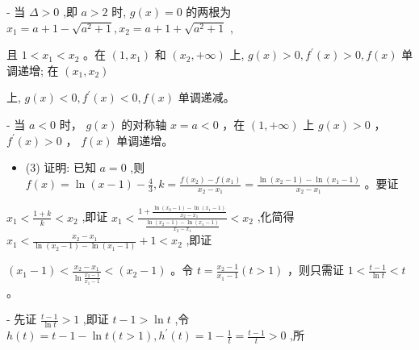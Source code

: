 \documentclass[10pt]{article}
\begin{document}
\hspace*{3em} - 当 \(\Delta  > 0\) ,即 \(a > 2\) 时, \(g\left( x\right)  = 0\) 的两根为 \({x}_{1} = a + 1 - \sqrt{{a}^{2} + 1},{x}_{2} = a + 1 + \sqrt{{a}^{2} + 1}\) ,

\hspace*{4em} 且 \(1 < {x}_{1} < {x}_{2}\) 。在 \(\left( {1,{x}_{1}}\right)\) 和 \(\left( {{x}_{2}, + \infty }\right)\) 上, \(g\left( x\right)  > 0,{f}^{\prime }\left( x\right)  > 0,f\left( x\right)\) 单调递增; 在 \(\left( {{x}_{1},{x}_{2}}\right)\)

\hspace*{4em} 上, \(g\left( x\right)  < 0,{f}^{\prime }\left( x\right)  < 0,f\left( x\right)\) 单调递减。

\hspace*{3em} - 当 \(a < 0\) 时， \(g\left( x\right)\) 的对称轴 \(x = a < 0\) ，在 \(\left( {1, + \infty }\right)\) 上 \(g\left( x\right)  > 0\) ， \({f}^{\prime }\left( x\right)  > 0\) ， \(f\left( x\right)\) 单调递增。

\begin{itemize}\relax
\item\relax (3) 证明: 已知 \(a = 0\) ,则 \(f\left( x\right)  = \ln \left( {x - 1}\right)  - \frac{4}{3},k = \frac{f\left( {x}_{2}\right)  - f\left( {x}_{1}\right) }{{x}_{2} - {x}_{1}} = \frac{\ln \left( {{x}_{2} - 1}\right)  - \ln \left( {{x}_{1} - 1}\right) }{{x}_{2} - {x}_{1}}\) 。要证
\end{itemize}

\hspace*{1em} \({x}_{1} < \frac{1 + k}{k} < {x}_{2}\) ,即证 \({x}_{1} < \frac{1 + \frac{\ln \left( {{x}_{2} - 1}\right)  - \ln \left( {{x}_{1} - 1}\right) }{{x}_{2} - {x}_{1}}}{\frac{\ln \left( {{x}_{2} - 1}\right)  - \ln \left( {{x}_{1} - 1}\right) }{{x}_{2} - {x}_{1}}} < {x}_{2}\) ,化简得 \({x}_{1} < \frac{{x}_{2} - {x}_{1}}{\ln \left( {{x}_{2} - 1}\right)  - \ln \left( {{x}_{1} - 1}\right) } + 1 < {x}_{2}\) ,即证

\hspace*{1em} \(\left( {{x}_{1} - 1}\right)  < \frac{{x}_{2} - {x}_{1}}{\ln \frac{{x}_{2} - 1}{{x}_{1} - 1}} < \left( {{x}_{2} - 1}\right)\) 。令 \(t = \frac{{x}_{2} - 1}{{x}_{1} - 1}\left( {t > 1}\right)\) ，则只需证 \(1 < \frac{t - 1}{\ln t} < t\) 。

\hspace*{1em} - 先证 \(\frac{t - 1}{\ln t} > 1\) ,即证 \(t - 1 > \ln t\) ,令 \(h\left( t\right)  = t - 1 - \ln t\left( {t > 1}\right) ,{h}^{\prime }\left( t\right)  = 1 - \frac{1}{t} = \frac{t - 1}{t} > 0\) ,所
\end{document}
